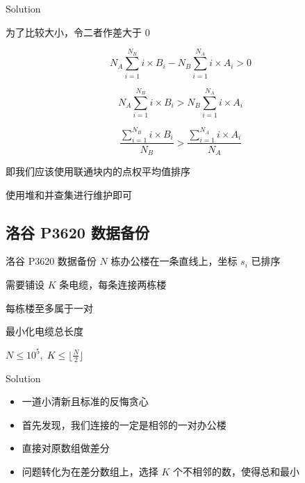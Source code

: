 ﻿\documentclass[aspectratio=169,handout]{ctexbeamer}
\begin{document}
\begin{frame}{Solution}
    

    为了比较大小，令二者作差大于 $ 0 $ 

    $$
        N_A\sum_{i=1}^{N_B}{i\times B_i}-N_B\sum_{i=1}^{N_A}{i\times A_i}>0
    $$

    $$
        N_A\sum_{i=1}^{N_B}{i\times B_i}>N_B\sum_{i=1}^{N_A}{i\times A_i} 
    $$

    $$
        \frac{\sum_{i=1}^{N_B}{i\times B_i}}{N_B}>\frac{\sum_{i=1}^{N_A}{i\times A_i}}{N_A}
    $$

    即我们应该使用联通块内的点权平均值排序

    使用堆和并查集进行维护即可

\end{frame}































\subsection{洛谷 P3620 数据备份}
\begin{frame}{洛谷 P3620 数据备份}
    $N$ 栋办公楼在一条直线上，坐标 $s_i$ 已排序

需要铺设 $K$ 条电缆，每条连接两栋楼

每栋楼至多属于一对

最小化电缆总长度

$N\leq 10^5,\; K\le\lfloor\frac{N}{2}\rfloor$
\end{frame}

\begin{frame}{Solution}
    \begin{itemize}
        \item 一道小清新且标准的反悔贪心
        \item 首先发现，我们连接的一定是相邻的一对办公楼
        \item 直接对原数组做差分
        \item 问题转化为在差分数组上，选择 $K$ 个不相邻的数，使得总和最小
    \end{itemize}
\end{frame}
\end{document}
